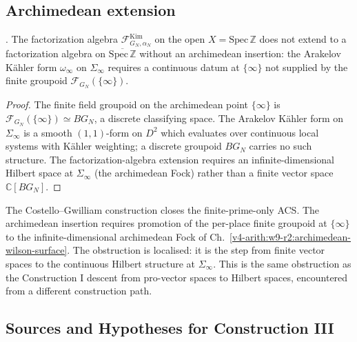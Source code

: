 \subsection{Archimedean extension}
\label{v4-arith:w10-a:CG-infty}

\begin{proposition}
\label{v4-arith:w10-a:prop:CG-infty-obstruction}
\ClaimStatusProvedHere. The factorization algebra
\(\mathcal F^{\mathrm{Kim}}_{G_{N},\alpha_{N}}\) on the open
\(X=\mathrm{Spec}\,\mathbb{Z}\) does not extend to a factorization
algebra on \(\overline{\mathrm{Spec}\,\mathbb{Z}}\) without an
archimedean insertion: the Arakelov K\"ahler form \(\omega_{\infty}\) on
\(\Sigma_{\infty}\) requires a continuous datum at \(\{\infty\}\) not
supplied by the finite groupoid \(\mathcal F_{G_{N}}(\{\infty\})\).
\end{proposition}

\begin{proof}
The finite field groupoid on the archimedean point
\(\{\infty\}\) is
\(\mathcal F_{G_{N}}(\{\infty\})\simeq BG_{N}\), a discrete classifying
space. The Arakelov K\"ahler form on \(\Sigma_{\infty}\) is a smooth
\((1,1)\)-form on \(D^{2}\) which evaluates over continuous local
systems with K\"ahler weighting; a discrete groupoid
\(BG_{N}\) carries no such structure. The factorization-algebra
extension requires an infinite-dimensional Hilbert space at
\(\Sigma_{\infty}\) (the archimedean Fock) rather than a finite
vector space \(\mathbb C[BG_{N}]\).
\end{proof}

\begin{remark}
\label{v4-arith:w10-a:rem:construction-III-stop}
The Costello--Gwilliam construction closes the finite-prime-only
ACS. The archimedean insertion requires promotion of the
per-place finite groupoid at \(\{\infty\}\) to the
infinite-dimensional archimedean Fock of
Ch.~\ref{v4-arith:w9-r2:archimedean-wilson-surface}. The
obstruction is localised: it is the step from finite vector
spaces to the continuous Hilbert structure at \(\Sigma_{\infty}\).
This is the same obstruction as the Construction I descent from pro-vector
spaces to Hilbert spaces, encountered from a different construction path.
\end{remark}

\subsection{Sources and Hypotheses for Construction III}
\label{v4-arith:w10-a:ah:construction-III}

